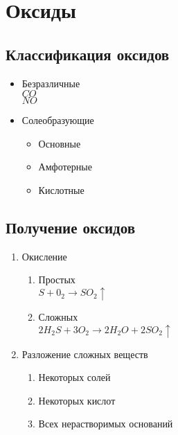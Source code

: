 \newpage
\section{Оксиды}
\subsection{Классификация оксидов}
\begin{itemize}
    \item Безразличные\\
    $CO$\\
    $NO$

    \item Солеобразующие
    \begin{itemize}
        \item Основные   
        \item Амфотерные 
        \item Кислотные  
    \end{itemize}
\end{itemize}



\subsection{Получение оксидов}
\begin{enumerate}
    \item Окисление
    \begin{enumerate}
        \item Простых\\
            $S + 0_2 \rightarrow SO_2\uparrow$
        \item Сложных\\
            $2H_2S + 3O_2 \rightarrow 2H_2O + 2SO_2\uparrow$
    \end{enumerate}

    \item Разложение сложных веществ
    \begin{enumerate}
        \item Некоторых солей
        \item Некоторых кислот
        \item Всех нерастворимых оснований\\
    \end{enumerate}
\end{enumerate}



